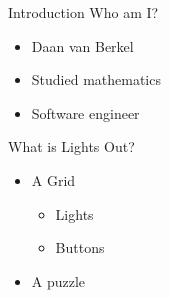 \begin{frame}{Introduction}
	Who am I?
	\begin{itemize}
		\item Daan van Berkel
		\item Studied mathematics
		\item Software engineer
	\end{itemize}
\end{frame}

\begin{frame}
	What is Lights Out?
	\begin{itemize}
		\item A Grid
		\begin{itemize}
			\item Lights
			\item Buttons
		\end{itemize}
		\item A puzzle
	\end{itemize}
\end{frame}
